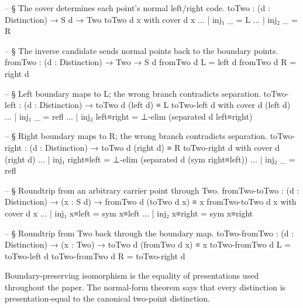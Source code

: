 \documentclass[11pt]{article}
\begin{document}
\begin{code}
-- § The cover determines each point's normal left/right code.
toTwo : (d : Distinction) → S d → Two
toTwo d x with cover d x
... | inj₁ _ = L
... | inj₂ _ = R

-- § The inverse candidate sends normal points back to the boundary points.
fromTwo : (d : Distinction) → Two → S d
fromTwo d L = left d
fromTwo d R = right d

-- § Left boundary maps to L; the wrong branch contradicts separation.
toTwo-left : (d : Distinction) → toTwo d (left d) ≡ L
toTwo-left d with cover d (left d)
... | inj₁ _ = refl
... | inj₂ left≡right = ⊥-elim (separated d left≡right)

-- § Right boundary maps to R; the wrong branch contradicts separation.
toTwo-right : (d : Distinction) → toTwo d (right d) ≡ R
toTwo-right d with cover d (right d)
... | inj₁ right≡left = ⊥-elim (separated d (sym right≡left))
... | inj₂ _ = refl

-- § Roundtrip from an arbitrary carrier point through Two.
fromTwo-toTwo : (d : Distinction) → (x : S d) → fromTwo d (toTwo d x) ≡ x
fromTwo-toTwo d x with cover d x
... | inj₁ x≡left = sym x≡left
... | inj₂ x≡right = sym x≡right

-- § Roundtrip from Two back through the boundary map.
toTwo-fromTwo : (d : Distinction) → (x : Two) → toTwo d (fromTwo d x) ≡ x
toTwo-fromTwo d L = toTwo-left d
toTwo-fromTwo d R = toTwo-right d
\end{code}

Boundary-preserving isomorphism is the equality of presentations used
throughout the paper.  The normal-form theorem says that every
distinction is presentation-equal to the canonical two-point
distinction.
\end{document}
